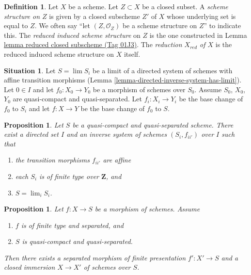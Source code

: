 \documentclass{amsart}
\theoremstyle{plain}
\newtheorem{proposition}[subsection]{Proposition}
\theoremstyle{definition}
\newtheorem{definition}[subsection]{Definition}
\newtheorem{situation}[subsection]{Situation}
\theoremstyle{remark}
\numberwithin{equation}{subsection}
\def\lim{\mathop{\mathrm{lim}}\nolimits}
\begin{document}
\begin{definition}
\label{schemes-definition-reduced-induced-scheme}
Let $X$ be a scheme. Let $Z \subset X$ be a closed subset.
A {\it scheme structure on $Z$} is given by a closed subscheme $Z'$ of
$X$ whose underlying set is equal to $Z$. We often say
``let $(Z, \mathcal{O}_Z)$ be a scheme structure on $Z$'' to
indicate this. The {\it reduced induced scheme structure}
on $Z$ is the one constructed in Lemma \href{https://stacks.math.columbia.edu/tag/01J3}{lemma reduced closed subscheme (Tag 01J3)}.
The {\it reduction $X_{red}$ of $X$} is the reduced induced scheme
structure on $X$ itself.
\end{definition}

\begin{situation}
\label{situation-descent-property}
Let $S = \lim S_i$ be a limit of a directed system of schemes
with affine transition morphisms
(Lemma \ref{lemma-directed-inverse-system-has-limit}).
Let $0 \in I$ and let $f_0 : X_0 \to Y_0$ be a morphism of schemes over $S_0$.
Assume $S_0$, $X_0$, $Y_0$ are quasi-compact and quasi-separated.
Let $f_i : X_i \to Y_i$ be the base change of $f_0$ to $S_i$ and
let $f : X \to Y$ be the base change of $f_0$ to $S$.
\end{situation}

\begin{proposition}
\label{proposition-approximate}
Let $S$ be a quasi-compact and quasi-separated scheme.
There exist a directed set $I$
and an inverse system of schemes $(S_i, f_{ii'})$ over $I$
such that
\begin{enumerate}
\item the transition morphisms $f_{ii'}$ are affine
\item each $S_i$ is of finite type over $\mathbf{Z}$, and
\item $S = \lim_i S_i$.
\end{enumerate}
\end{proposition}

\begin{proposition}
\label{proposition-separated-closed-in-finite-presentation}
Let $f : X \to S$ be a morphism of schemes. Assume
\begin{enumerate}
\item $f$ is of finite type and separated, and
\item $S$ is quasi-compact and quasi-separated.
\end{enumerate}
Then there exists a separated morphism of finite presentation
$f' : X' \to S$ and a closed immersion $X \to X'$ of schemes over $S$.
\end{proposition}
\end{document}
